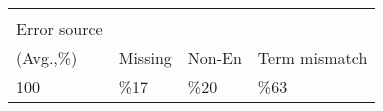 {
\ttfamily\small

\begin{tabular}{|l|l|l|l|}
\hline
  \backslashbox{k}{\\ Error source\\(Avg.,\%)} & Missing & Non-En & Term mismatch  \\\hline
 100 & \%17 & \%20 & \%63  \\ 
 \hline  
 \end{tabular} 

}
